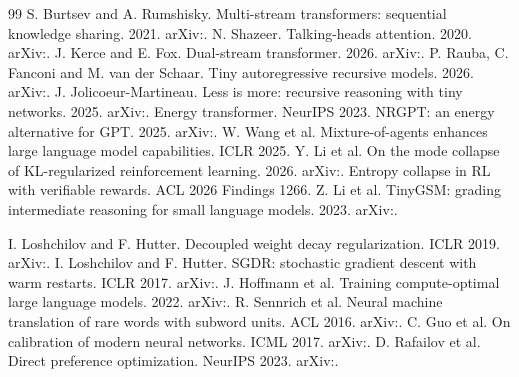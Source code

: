 \documentclass[11pt,a4paper]{article}
\theoremstyle{plain}
\theoremstyle{definition}
\theoremstyle{remark}
\begin{document}
\begin{thebibliography}{99}
 S. Burtsev and A. Rumshisky. Multi-stream transformers: sequential knowledge sharing. 2021. arXiv:.
 N. Shazeer. Talking-heads attention. 2020. arXiv:.
 J. Kerce and E. Fox. Dual-stream transformer. 2026. arXiv:.
 P. Rauba, C. Fanconi and M. van der Schaar. Tiny autoregressive recursive models. 2026. arXiv:.
 J. Jolicoeur-Martineau. Less is more: recursive reasoning with tiny networks. 2025. arXiv:.
 Energy transformer. NeurIPS 2023.
 NRGPT: an energy alternative for GPT. 2025. arXiv:.
 W. Wang et al. Mixture-of-agents enhances large language model capabilities. ICLR 2025.
 Y. Li et al. On the mode collapse of KL-regularized reinforcement learning. 2026. arXiv:.
 Entropy collapse in RL with verifiable rewards. ACL 2026 Findings 1266.
 Z. Li et al. TinyGSM: grading intermediate reasoning for small language models. 2023. arXiv:.

 I. Loshchilov and F. Hutter. Decoupled weight decay regularization. ICLR 2019. arXiv:.
 I. Loshchilov and F. Hutter. SGDR: stochastic gradient descent with warm restarts. ICLR 2017. arXiv:.
 J. Hoffmann et al. Training compute-optimal large language models. 2022. arXiv:.
 R. Sennrich et al. Neural machine translation of rare words with subword units. ACL 2016. arXiv:.
 C. Guo et al. On calibration of modern neural networks. ICML 2017. arXiv:.
 D. Rafailov et al. Direct preference optimization. NeurIPS 2023. arXiv:.

\end{thebibliography}
\end{document}
